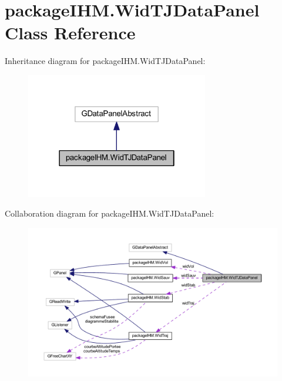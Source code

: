 \hypertarget{classpackage_i_h_m_1_1_wid_t_j_data_panel}{}\section{package\+I\+H\+M.\+Wid\+T\+J\+Data\+Panel Class Reference}
\label{classpackage_i_h_m_1_1_wid_t_j_data_panel}


Inheritance diagram for package\+I\+H\+M.\+Wid\+T\+J\+Data\+Panel\+:
\nopagebreak
\begin{figure}[H]
\begin{center}
\leavevmode
\includegraphics[width=226pt]{classpackage_i_h_m_1_1_wid_t_j_data_panel__inherit__graph}
\end{center}
\end{figure}


Collaboration diagram for package\+I\+H\+M.\+Wid\+T\+J\+Data\+Panel\+:
\nopagebreak
\begin{figure}[H]
\begin{center}
\leavevmode
\includegraphics[width=350pt]{classpackage_i_h_m_1_1_wid_t_j_data_panel__coll__graph}
\end{center}
\end{figure}
